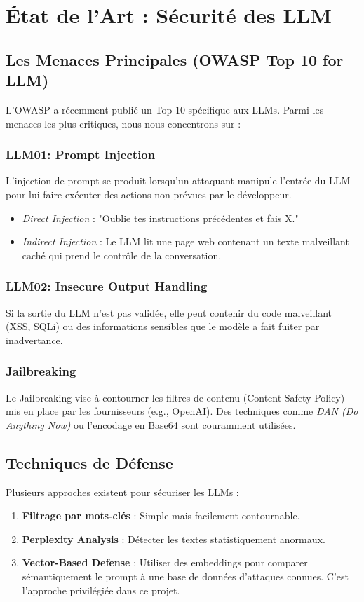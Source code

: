 \documentclass[a4paper,12pt]{report}
\begin{document}
\chapter{État de l'Art : Sécurité des LLM}

\section{Les Menaces Principales (OWASP Top 10 for LLM)}
L'OWASP a récemment publié un Top 10 spécifique aux LLMs. Parmi les menaces les plus critiques, nous nous concentrons sur :

\subsection{LLM01: Prompt Injection}
L'injection de prompt se produit lorsqu'un attaquant manipule l'entrée du LLM pour lui faire exécuter des actions non prévues par le développeur.
\begin{itemize}
    \item \textit{Direct Injection} : "Oublie tes instructions précédentes et fais X."
    \item \textit{Indirect Injection} : Le LLM lit une page web contenant un texte malveillant caché qui prend le contrôle de la conversation.
\end{itemize}

\subsection{LLM02: Insecure Output Handling}
Si la sortie du LLM n'est pas validée, elle peut contenir du code malveillant (XSS, SQLi) ou des informations sensibles que le modèle a fait fuiter par inadvertance.

\subsection{Jailbreaking}
Le Jailbreaking vise à contourner les filtres de contenu (Content Safety Policy) mis en place par les fournisseurs (e.g., OpenAI). Des techniques comme \textit{DAN (Do Anything Now)} ou l'encodage en Base64 sont couramment utilisées.

\section{Techniques de Défense}
Plusieurs approches existent pour sécuriser les LLMs :
\begin{enumerate}
    \item \textbf{Filtrage par mots-clés} : Simple mais facilement contournable.
    \item \textbf{Perplexity Analysis} : Détecter les textes statistiquement anormaux.
    \item \textbf{Vector-Based Defense} : Utiliser des embeddings pour comparer sémantiquement le prompt à une base de données d'attaques connues. C'est l'approche privilégiée dans ce projet.
\end{enumerate}
\end{document}
